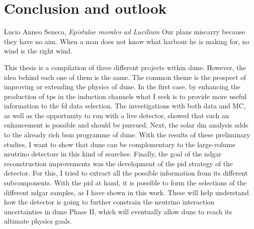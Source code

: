 \chapter{Conclusion and outlook}
\label{chapter:conclusion}

\begin{chapquote}{Lucio Anneo Seneca, \textit{Epistulae morales ad Lucilium}}
    Our plans miscarry because they have no aim. When a man does not know what harbour he is making for, no wind is the right wind.
\end{chapquote}

This thesis is a compilation of three different projects within \gls{dune}. However, the idea behind each one of them is the same. The common theme is the prospect of improving or extending the physics of \gls{dune}. In the first case, by enhancing the production of \gls{tp}s in the induction channels what I seek is to provide more useful information to the \gls{fd} data selection. The investigations with both data and MC, as well as the opportunity to run with a live detector, showed that such an enhancement is possible and should be pursued. Next, the solar \gls{dm} analysis adds to the already rich \gls{bsm} programme of \gls{dune}. With the results of these preliminary studies, I want to show that \gls{dune} can be complementary to the large-volume neutrino detectors in this kind of searches. Finally, the goal of the \gls{ndgar} reconstruction improvements was the development of the \gls{pid} strategy of the detector. For this, I tried to extract all the possible information from its different subcomponents. With the \gls{pid} at hand, it is possible to form the selections of the different \gls{ndgar} samples, as I have shown in this work. These will help understand how the detector is going to further constrain the neutrino interaction uncertainties in \gls{dune} Phase II, which will eventually allow \gls{dune} to reach its ultimate physics goals.


